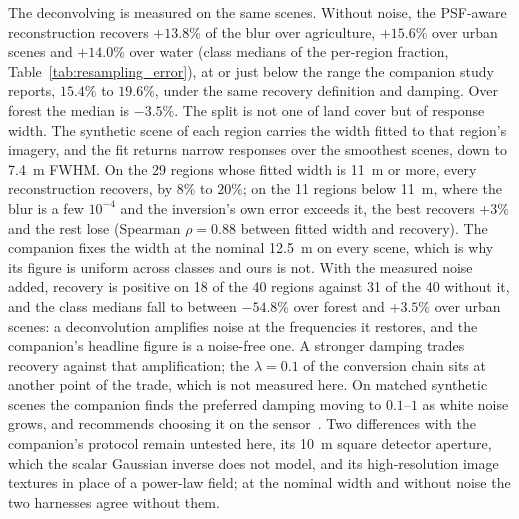 The deconvolving  is measured on the same scenes. Without
noise, the PSF-aware reconstruction recovers $+13.8\%$ of the blur over
agriculture, $+15.6\%$ over urban scenes and $+14.0\%$ over water
(class medians of the per-region fraction,
Table~\ref{tab:resampling_error}), at or just below the range the
companion study reports, $15.4\%$ to $19.6\%$, under the same recovery
definition and damping. Over forest the median is $-3.5\%$. The split is not one of
land cover but of response width. The synthetic scene of each region
carries the width fitted to that region's imagery, and the fit returns
narrow responses over the smoothest scenes, down to \SI{7.4}{m} FWHM.
On the 29 regions whose fitted width is \SI{11}{m} or more, every
reconstruction recovers, by $8\%$ to $20\%$; on the 11 regions below
\SI{11}{m}, where the blur is a few $10^{-4}$ and the inversion's own
error exceeds it, the best recovers $+3\%$ and the rest lose
(Spearman $\rho=0.88$ between fitted width and recovery). The companion
fixes the width at the nominal \SI{12.5}{m} on every scene, which is
why its figure is uniform across classes and ours is not. With the
measured noise added, recovery is positive on 18 of the 40 regions
against 31 of the 40 without it, and the class medians fall to between
$-54.8\%$ over forest and $+3.5\%$ over urban scenes: a deconvolution
amplifies noise at the frequencies it restores, and the companion's
headline figure is a noise-free one. A stronger damping trades recovery
against that amplification; the $\lambda=0.1$ of the conversion chain
sits at another point of the trade, which is not measured here. On
matched synthetic scenes the companion finds the preferred damping
moving to $0.1$--$1$ as white noise grows, and recommends choosing it on
the  sensor~\cite{delouis2026resample}. Two differences with the companion's
protocol remain untested here, its \SI{10}{m} square detector aperture,
which the scalar Gaussian inverse does not model, and its high-resolution
image textures in place of a power-law field; at the nominal width and
without noise the two harnesses agree without them.


